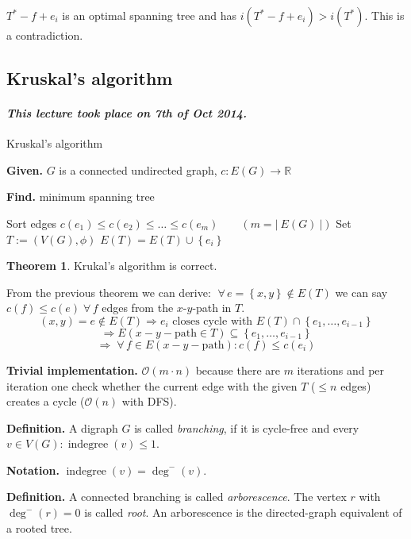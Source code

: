 \documentclass[a4paper]{article}
\theoremstyle{definition}
\newtheorem{theorem}{Theorem}
\newcommand{\card}[1]{\left|\:\!#1\:\!\right|}
\newcommand{\set}[1]{\left\{#1\right\}}
\newcommand{\given}[1]{\textbf{Given.} #1\par}
\newcommand{\find}[1]{\textbf{Find.} #1\par}
\newcommand{\dateref}[1]{\paragraph{\textit{This lecture took place on #1.}}}
\newcommand{\gath}[2]{$#1$-$#2$-path} %
\newcommand{\fall}{\;\forall\,}
\begin{document}
$T^* - f + e_i$ is an optimal spanning tree and has $i(T^* - f + e_i) > i(T^*)$. This is a contradiction.

\subsection{Kruskal's algorithm}
%
\dateref{7th of Oct 2014}

\begin{algorithm}
  \caption{Kruskal's algorithm}
  \label{kruskals-algo}
  \given{$G$ is a connected undirected graph, $c: E(G) \rightarrow \mathbb{R}$}
  \find{minimum spanning tree}
\begin{algorithmic}[1]
  \State Sort edges $c(e_1) \leq c(e_2) \leq \ldots \leq c(e_m) \qquad (m = \card{E(G)})$
  \State Set $T := (V(G), \phi)$
    \If{$T \cup \set{e_i}$ is cycle-free}
      \State $E(T) = E(T) \cup \set{e_i}$
    \EndIf
  \EndFor
\end{algorithmic}
\end{algorithm}

\begin{theorem}\label{satz-2.3}
  Krukal's algorithm is correct.
\end{theorem}

From the previous theorem we can derive: $\fall e = \set{x, y} \notin E(T)$
we can say $c(f) \leq c(e) \fall f$ edges from the \gath xy in $T$.
\[
    (x, y) = e \notin E(T) \Rightarrow e_i \text{ closes cycle with } E(T) \cap \set{e_1, \ldots, e_{i-1}}
\] \[
    \Rightarrow E(x-y-\text{path} \in T) \subseteq \set{e_1, \ldots, e_{i-1}}
\] \[
    \Rightarrow \fall f \in E(x-y-\text{path}): c(f) \leq c(e_i)
\]

\textbf{Trivial implementation.}
  $\mathcal{O}(m\cdot n)$ because there are $m$ iterations and
  per iteration one check whether the current edge with the given $T$ ($\leq n$ edges)
  creates a cycle ($\mathcal{O}(n)$ with DFS).

\textbf{Definition.}
  A digraph $G$ is called \emph{branching}, if it is cycle-free and
  every $v \in V(G): \operatorname{indegree}(v) \leq 1$.

\textbf{Notation.}
  $\operatorname{indegree}(v) = \operatorname{deg}^-(v)$.

\textbf{Definition.}
  A connected branching is called \emph{arborescence}.
  The vertex $r$ with $\operatorname{deg}^-(r) = 0$ is called \emph{root}.
  An arborescence is the directed-graph equivalent of a rooted tree.
\end{document}
